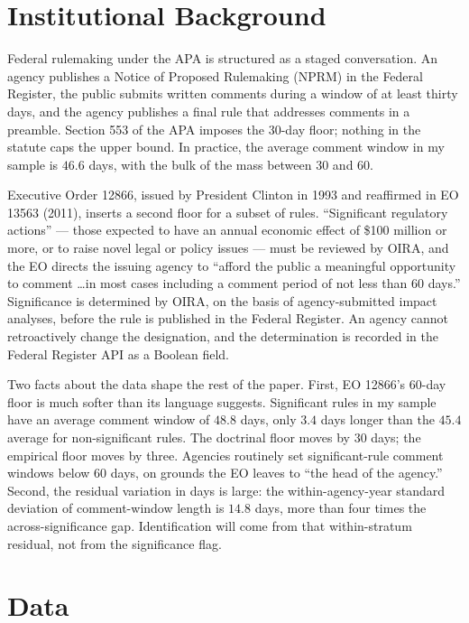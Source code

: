 \documentclass[12pt]{article}
\begin{document}
\section{Institutional Background}

Federal rulemaking under the APA is structured as a staged conversation. An agency publishes a Notice of Proposed Rulemaking (NPRM) in the Federal Register, the public submits written comments during a window of at least thirty days, and the agency publishes a final rule that addresses comments in a preamble. Section 553 of the APA imposes the 30-day floor; nothing in the statute caps the upper bound. In practice, the average comment window in my sample is $46.6$ days, with the bulk of the mass between 30 and 60.

Executive Order 12866, issued by President Clinton in 1993 and reaffirmed in EO 13563 (2011), inserts a second floor for a subset of rules. ``Significant regulatory actions'' --- those expected to have an annual economic effect of \$100 million or more, or to raise novel legal or policy issues --- must be reviewed by OIRA, and the EO directs the issuing agency to ``afford the public a meaningful opportunity to comment \dots in most cases including a comment period of not less than 60 days.'' Significance is determined by OIRA, on the basis of agency-submitted impact analyses, before the rule is published in the Federal Register. An agency cannot retroactively change the designation, and the determination is recorded in the Federal Register API as a Boolean field.

Two facts about the data shape the rest of the paper. First, EO 12866's 60-day floor is much softer than its language suggests. Significant rules in my sample have an average comment window of $48.8$ days, only $3.4$ days longer than the $45.4$ average for non-significant rules. The doctrinal floor moves by 30 days; the empirical floor moves by three. Agencies routinely set significant-rule comment windows below 60 days, on grounds the EO leaves to ``the head of the agency.'' Second, the residual variation in days is large: the within-agency-year standard deviation of comment-window length is $14.8$ days, more than four times the across-significance gap. Identification will come from that within-stratum residual, not from the significance flag.

\section{Data}
\end{document}
